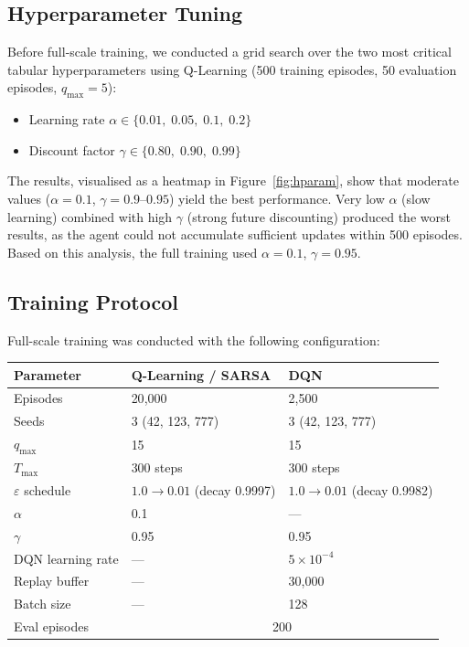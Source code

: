 \documentclass[12pt]{article}
\begin{document}
\subsection{Hyperparameter Tuning}
\label{sec:hparam}
Before full-scale training, we conducted a grid search over the two most critical
tabular hyperparameters using Q-Learning (500 training episodes, 50 evaluation episodes,
$q_\text{max}=5$):
\begin{itemize}[noitemsep]
    \item Learning rate $\alpha \in \{0.01,\; 0.05,\; 0.1,\; 0.2\}$
    \item Discount factor $\gamma \in \{0.80,\; 0.90,\; 0.99\}$
\end{itemize}
The results, visualised as a heatmap in Figure~\ref{fig:hparam}, show that moderate
values ($\alpha=0.1$, $\gamma=0.9$--$0.95$) yield the best performance. Very low
$\alpha$ (slow learning) combined with high $\gamma$ (strong future discounting)
produced the worst results, as the agent could not accumulate sufficient updates within
500 episodes. Based on this analysis, the full training used $\alpha=0.1$, $\gamma=0.95$.

\subsection{Training Protocol}
Full-scale training was conducted with the following configuration:
\begin{center}
\begin{tabular}{lll}
\toprule
\textbf{Parameter} & \textbf{Q-Learning / SARSA} & \textbf{DQN} \\
\midrule
Episodes & 20{,}000 & 2{,}500 \\
Seeds & 3 (42, 123, 777) & 3 (42, 123, 777) \\
$q_\text{max}$ & 15 & 15 \\
$T_\text{max}$ & 300 steps & 300 steps \\
$\varepsilon$ schedule & $1.0 \to 0.01$ (decay 0.9997) & $1.0 \to 0.01$ (decay 0.9982) \\
$\alpha$ & 0.1 & --- \\
$\gamma$ & 0.95 & 0.95 \\
DQN learning rate & --- & $5\times10^{-4}$ \\
Replay buffer & --- & 30{,}000 \\
Batch size & --- & 128 \\
Eval episodes & \multicolumn{2}{c}{200} \\
\bottomrule
\end{tabular}
\end{center}
\end{document}
